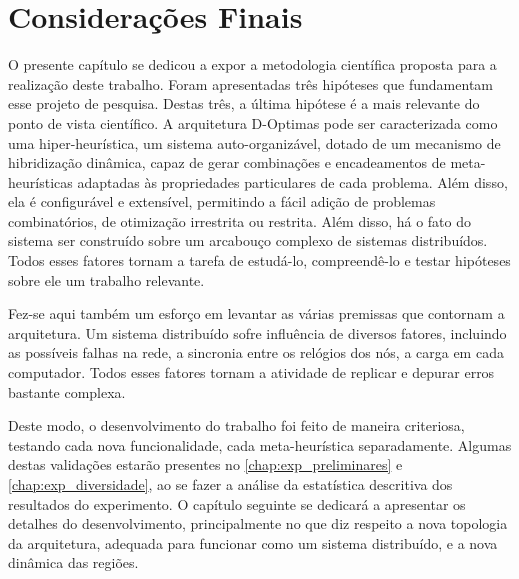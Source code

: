 \section{Considerações Finais}
O presente capítulo se dedicou a expor a metodologia científica proposta para a realização deste trabalho. Foram apresentadas três hipóteses que fundamentam esse projeto de pesquisa. Destas três, a última hipótese é a mais relevante do ponto de vista científico. A arquitetura D-Optimas pode ser caracterizada como uma hiper-heurística, um sistema auto-organizável, dotado de um mecanismo de hibridização dinâmica, capaz de gerar combinações e encadeamentos de meta-heurísticas adaptadas às propriedades particulares de cada problema. Além disso, ela é configurável e extensível, permitindo a fácil adição de problemas combinatórios, de otimização irrestrita ou restrita. Além disso, há o fato do sistema ser construído sobre um arcabouço complexo de sistemas distribuídos.  Todos esses fatores tornam a tarefa de estudá-lo, compreendê-lo e testar hipóteses sobre ele um trabalho relevante.

Fez-se aqui também um esforço em levantar as várias premissas que contornam a arquitetura. Um sistema distribuído sofre influência de diversos fatores, incluindo as possíveis falhas na rede, a sincronia entre os relógios dos nós, a carga em cada computador. Todos esses fatores tornam a atividade de replicar e depurar erros bastante complexa. 

Deste modo, o desenvolvimento do trabalho foi feito de maneira criteriosa, testando cada nova funcionalidade, cada meta-heurística separadamente. Algumas destas validações estarão presentes no \autoref{chap:exp_preliminares} e \autoref{chap:exp_diversidade}, ao se fazer a análise da estatística descritiva dos resultados do experimento. O capítulo seguinte se dedicará a apresentar os detalhes do desenvolvimento, principalmente no que diz respeito a nova topologia da arquitetura, adequada para funcionar como um sistema distribuído, e a nova dinâmica das regiões. 